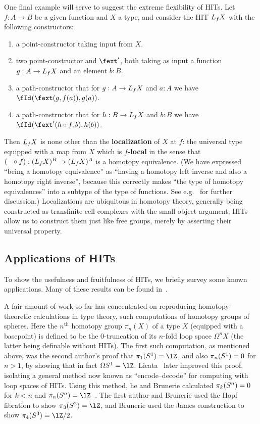 \documentclass{amsart}
\begin{document}
One final example will serve to suggest the extreme flexibility of HITs.
Let $f:A\to B$ be a given function and $X$ a type, and consider the HIT $L_{f} X$ with the following constructors:
\begin{enumerate}
\item a point-constructor taking input from $X$.
\item two point-constructor \fext and $\fext'$, both taking as input a function $g:A\to L_{f} X$ and an element $b:B$.
\item a path-constructor that for $g:A\to L_{f} X$ and $a:A$ we have $\id{\fext(g,f(a))}{g(a)}$.
\item a path-constructor that for $h:B\to L_{f} X$ and $b:B$ we have $\id{\fext'(h\circ f,b)}{h(b)}$.
\end{enumerate}
Then $L_{f} X$ is none other than the \textbf{localization} of $X$ at $f$: the universal type equipped with a map from $X$ which is \textbf{$f$-local} in the sense that $(\mathord{\hspace{1pt}\text{--}\hspace{1pt}}\circ f):(L_{f} X)^B \to (L_{f} X)^A$ is a homotopy equivalence.
(We have expressed ``being a homotopy equivalence'' as ``having a homotopy left inverse and also a homotopy right inverse'', because this correctly makes ``the type of homotopy equivalences'' into a subtype of the type of functions.
See e.g.~\cite[Chapter 4]{hottbook} for further discussion.)
Localizations are ubiquitous in homotopy theory, generally being constructed as transfinite cell complexes with the small object argument; HITs allow us to construct them just like free groups, merely by asserting their universal property.


\subsection{Applications of HITs}
\label{sec:hit-apps}

To show the usefulness and fruitfulness of HITs, we briefly survey some known applications.
Many of these results can be found in~\cite{hottbook}.

A fair amount of work so far has concentrated on reproducing homotopy-theoretic calculations in type theory, such computations of homotopy groups of spheres.
Here the $n^{\mathrm{th}}$ homotopy group $\pi_n(X)$ of a type $X$ (equipped with a basepoint) is defined to be the $0$-truncation of its $n$-fold loop space $\Omega^n X$ (the latter being definable without HITs).
The first such computation, as mentioned above, was the second author's proof that $\pi_1(\circtype)=\lZ$, and also $\pi_n(S^1)=0$ for $n>1$, by showing that in fact $\Omega \circtype = \lZ$.
Licata~\cite{ls:pi1s1} later improved this proof, isolating a general method now known as ``encode--decode'' for computing with loop spaces of HITs.
Using this method, he and Brunerie calculated $\pi_k(S^{n}) = 0$ for $k<n$ and $\pi_n(\spheretype n) = \lZ$~\cite{lb:pinsn}.
The first author and Brunerie used the Hopf fibration to show $\pi_3(\spheretype 2) = \lZ$, and Brunerie used the James construction to show $\pi_4(\spheretype 3) = \lZ/2$.
\end{document}
